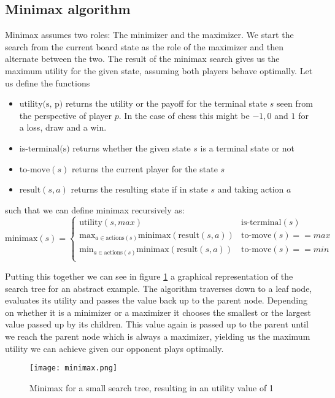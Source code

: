 \subsection{Minimax algorithm}
Minimax assumes two roles: The minimizer and the maximizer. We start the search from the current board state as the role of the maximizer and then alternate between the two. The result of the minimax search gives us the maximum utility for the given state, assuming both players behave optimally. Let us define the functions
\begin{itemize}
    \item $\text{utility(s, p)}$ returns the utility or the payoff for the terminal state $s$ seen from the perspective of player $p$. In the case of chess this might be $-1, 0$ and $1$ for a loss, draw and a win.
    \item $\text{is-terminal(s)}$ returns whether the given state $s$ is a terminal state or not
    \item $\text{to-move}(s)$ returns the current player for the state $s$
    \item $\text{result}(s, a)$ returns the resulting state if in state $s$ and taking action $a$
\end{itemize}
such that we can define minimax recursively as:
$$
    \text{minimax}(s) =
    \begin{cases}
        \text{utility}(s, max)                                                & \text{is-terminal}(s)    \\
        \text{max}_{a\in\text{actions}(s)}\text{minimax}(\text{result}(s, a)) & \text{to-move}(s) == max \\
        \text{min}_{a\in\text{actions}(s)}\text{minimax}(\text{result}(s, a)) & \text{to-move}(s) == min \\
    \end{cases}
$$

Putting this together we can see in figure \ref{minimax} a graphical representation of the search tree for an abstract example. The algorithm traverses down to a leaf node, evaluates its utility and passes the value back up to the parent node. Depending on whether it is a minimizer or a maximizer it chooses the smallest or the largest value passed up by its children. This value again is passed up to the parent until we reach the parent node which is always a maximizer, yielding us the maximum utility we can achieve given our opponent plays optimally.

\begin{figure}
    \centering
    \texttt{[image: minimax.png]}
    \caption{Minimax for a small search tree, resulting in an utility value of 1}
    \label{minimax}
\end{figure}

